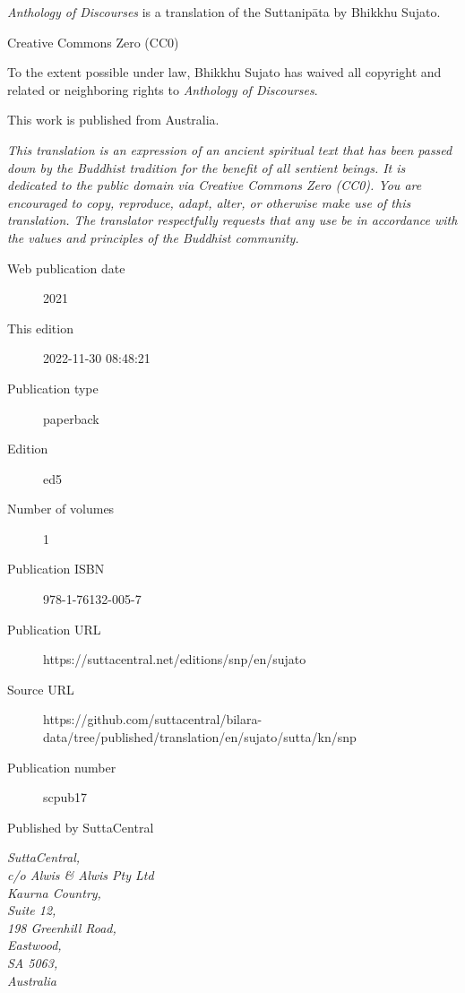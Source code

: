 \documentclass[12pt,openany]{book}%
\begin{document}
\begin{footnotesize}

\textit{Anthology of Discourses} is a translation of the Suttanipāta by Bhikkhu Sujato.

\medskip

Creative Commons Zero (CC0)

To the extent possible under law, Bhikkhu Sujato has waived all copyright and related or neighboring rights to \textit{Anthology of Discourses}.

\medskip

This work is published from Australia.

\begin{center}
\textit{This translation is an expression of an ancient spiritual text that has been passed down by the Buddhist tradition for the benefit of all sentient beings. It is dedicated to the public domain via Creative Commons Zero (CC0). You are encouraged to copy, reproduce, adapt, alter, or otherwise make use of this translation. The translator respectfully requests that any use be in accordance with the values and principles of the Buddhist community.}
\end{center}

\medskip

\begin{description}
    \item[Web publication date] 2021
    \item[This edition] 2022-11-30 08:48:21
    \item[Publication type] paperback
    \item[Edition] ed5
    \item[Number of volumes] 1
    \item[Publication ISBN] 978-1-76132-005-7
    \item[Publication URL] https://suttacentral.net/editions/snp/en/sujato
    \item[Source URL] https://github.com/suttacentral/bilara-data/tree/published/translation/en/sujato/sutta/kn/snp
    \item[Publication number] scpub17
\end{description}

\medskip

Published by SuttaCentral

\medskip

\textit{SuttaCentral,\\
c/o Alwis \& Alwis Pty Ltd\\
Kaurna Country,\\
Suite 12,\\
198 Greenhill Road,\\
Eastwood,\\
SA 5063,\\
Australia}

\end{footnotesize}
\end{document}
